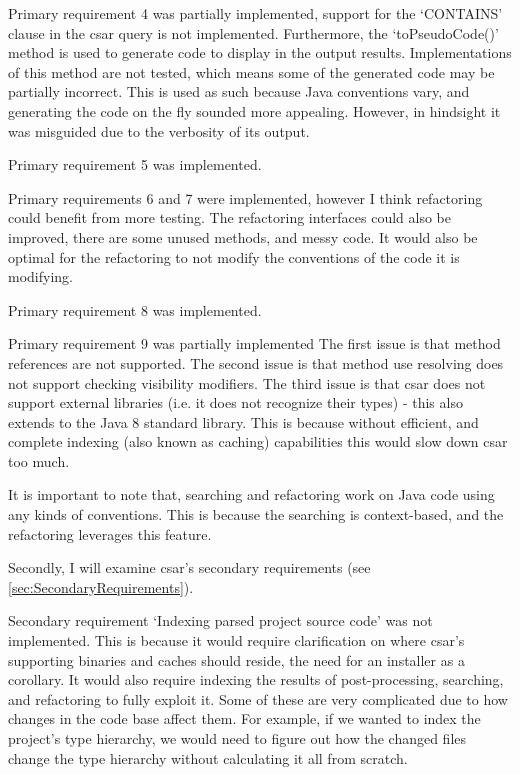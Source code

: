 \documentclass[12pt, letterpaper]{article}
\begin{document}
Primary requirement 4 was partially implemented, support for the `CONTAINS' clause in the csar query is not implemented.
Furthermore, the `toPseudoCode()' method is used to generate code to display in the output results.
Implementations of this method are not tested, which means some of the generated code may be partially incorrect.
This is used as such because Java conventions vary, and generating the code on the fly sounded more appealing.
However, in hindsight it was misguided due to the verbosity of its output.

Primary requirement 5 was implemented.

Primary requirements 6 and 7 were implemented, however I think refactoring could benefit from more testing.
The refactoring interfaces could also be improved, there are some unused methods, and messy code.
It would also be optimal for the refactoring to not modify the conventions of the code it is modifying.

Primary requirement 8 was implemented.

Primary requirement 9 was partially implemented
The first issue is that method references are not supported.
The second issue is that method use resolving does not support checking visibility modifiers.
The third issue is that csar does not support external libraries (i.e. it does not recognize their types) - this also extends to the Java 8 standard library.
This is because without efficient, and complete indexing (also known as caching) capabilities this would slow down csar too much.

It is important to note that, searching and refactoring work on Java code using any kinds of conventions.
This is because the searching is context-based, and the refactoring leverages this feature.

Secondly, I will examine csar's secondary requirements (see \ref{sec:SecondaryRequirements}).

Secondary requirement `Indexing parsed project source code' was not implemented.
This is because it would require clarification on where csar's supporting binaries and caches should reside, the need for an installer as a corollary.
It would also require indexing the results of post-processing, searching, and refactoring to fully exploit it.
Some of these are very complicated due to how changes in the code base affect them.
For example, if we wanted to index the project's type hierarchy, we would need to figure out how the changed files change the type hierarchy without calculating it all from scratch.
\end{document}
